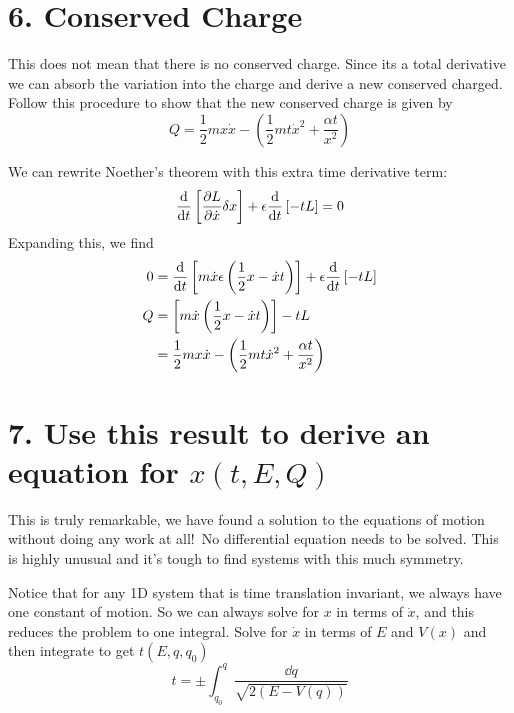 \documentclass[a4paper,twoside]{article}
\begin{document}
\section*{6. Conserved Charge}
This does not mean that there is no conserved charge. Since its a total derivative we can absorb the variation into the charge and derive a new conserved charged. Follow this procedure to show that the new conserved charge is given by
\begin{equation}
    Q = \frac{1}{2} m x\dot{x} - \left( \frac{1}{2} mt\dot{x}^2 + \frac{\alpha t}{x^2} \right)
\end{equation}
\begin{problem}
    We can rewrite Noether's theorem with this extra time derivative term:
    \begin{equation}
        \dv{t} \left[ \pdv{L}{\dot{x}} \delta x \right] + \epsilon \dv{t}\left[ -tL \right] = 0
    \end{equation}
    Expanding this, we find
    \begin{align}
        0 &= \dv{t} \left[ m \dot{x} \epsilon \left( \frac{1}{2} x - \dot{x}t \right)\right] + \epsilon \dv{t}\left[ -tL \right] \\
        Q &= \left[ m \dot{x} \left( \frac{1}{2} x - \dot{x}t \right) \right] - tL \\
        &= \frac{1}{2} m x \dot{x} - \left( \frac{1}{2} mt\dot{x}^2 + \frac{\alpha t}{x^2} \right)
    \end{align}
\end{problem}

\section*{7. Use this result to derive an equation for $ x(t, E, Q) $}
This is truly remarkable, we have found a solution to the equations of motion without doing any work at all!\ No differential equation needs to be solved. This is highly unusual and it’s tough to find systems with this much symmetry.

Notice that for any 1D system that is time translation invariant, we always have one constant of motion. So we can always solve for $ x $ in terms of $ \dot{x} $, and this reduces the problem to one integral. Solve for $ \dot{x} $ in terms of $ E $ and $ V(x) $ and then integrate to get $ t(E,q,q_0) $
\begin{equation}
    t = \pm \int^q_{q_0} \frac{\dd{q}}{\sqrt{2(E-V(q))}}
\end{equation}
\end{document}
